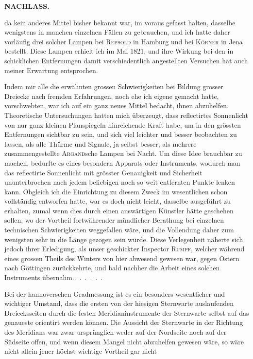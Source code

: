 \noindent{}\hfill{\small\textbf{NACHLASS.}}\hfill\null\par\medskip
\noindent da kein anderes Mittel bisher bekannt war, im voraus gefasst halten, dasselbe
wenigstens in manchen einzelnen Fällen zu gebrauchen, und ich hatte
daher vorläufig drei solcher Lampen bei \textsc{Repsold} in Hamburg und bei \textsc{Körner}
in Jena bestellt. Diese Lampen erhielt ich im Mai 1821, und ihre Wirkung
bei den in schicklichen Entfernungen damit verschiedentlich angestellten Versuchen
hat auch meiner Erwartung entsprochen.

\par\noindent\hspace*{\parindent}Indem mir alle die erwähnten grossen Schwierigkeiten bei Bildung grosser
Dreiecke nach fremden Erfahrungen, noch ehe ich eigene gemacht hatte, vorschwebten,
war ich auf ein ganz neues Mittel bedacht, ihnen abzuhelfen.
Theoretische Untersuchungen hatten mich überzeugt, dass reflectirtes Sonnenlicht
von nur ganz kleinen Planspiegeln hinreichende Kraft habe, um in den
grössten Entfernungen sichtbar zu sein, und sich viel leichter und besser beobachten
zu lassen, als alle Thürme und Signale, ja selbst besser, als mehrere
zusammengestellte \textsc{Argand}sche Lampen bei Nacht. Um diese Idee brauchbar
zu machen, bedurfte es eines besondern Apparats oder Instruments, wodurch
man das reflectirte Sonnenlicht mit grösster Genauigkeit und Sicherheit ununterbrochen
nach jedem beliebigen noch so weit entfernten Punkte lenken
kann. Obgleich ich die Einrichtung zu diesem Zweck im wesentlichen schon
vollständig entworfen hatte, war es doch nicht leicht, dasselbe ausgeführt zu
erhalten, zumal wenn dies durch einen auswärtigen Künstler hätte geschehen
sollen, wo der Vortheil fortwährender mündlicher Berathung bei einzelnen
technischen Schwierigkeiten weggefallen wäre, und die Vollendung daher zum
wenigsten sehr in die Länge gezogen sein würde. Diese Verlegenheit näherte
sich jedoch ihrer Erledigung, als unser geschickter Inspector \textsc{Rumpf}, welcher
während eines grossen Theils des Winters von hier abwesend gewesen war,
gegen Ostern nach Göttingen zurückkehrte, und bald nachher die Arbeit eines
solchen Instruments \mbox{übernahm.\enspace\mbox{.\ .\ .\ .\ .\ .}}

\par\noindent\hspace*{\parindent}Bei der hannoverschen Gradmessung ist es ein besonders wesentlicher und
wichtiger Umstand, dass die ersten von der hiesigen Sternwarte auslaufenden
Dreiecksseiten durch die festen Meridianinstrumente der Sternwarte selbst
auf das genaueste orientirt werden können. Die Aussicht der Sternwarte in
der Richtung des Meridians war zwar ursprünglich weder auf der Nordseite
noch auf der Südseite offen, und wenn diesem Mangel nicht abzuhelfen gewesen
wäre, so wäre nicht allein jener höchst wichtige Vortheil gar nicht
\par\clearpage

